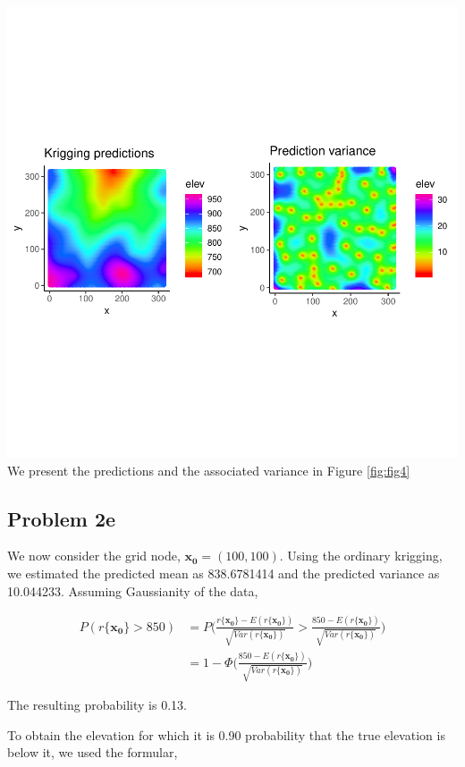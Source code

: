 \documentclass[]{article}
\newcommand{\vect}[1]{\ensuremath{\boldsymbol{\mathbf{#1}}}}
\begin{document}
\includegraphics{Exercise-1_files/figure-latex/fig4-1.pdf} We present
the predictions and the associated variance in Figure \ref{fig:fig4}

\hypertarget{problem-2e}{%
\subsection{Problem 2e}\label{problem-2e}}

We now consider the grid node, \(\vect{x_0} = (100,100)\). Using the
ordinary krigging, we estimated the predicted mean as 838.6781414 and
the predicted variance as 10.044233. Assuming Gaussianity of the data,

\begin{equation*}
    \begin{split}
P(r\{\vect{x_0}\} > 850) &=P\bigg( \frac{r\{\vect{x_0}\}- E(r\{\vect{x_0}\})}{\sqrt{Var(r\{\vect{x_0}\})}}> \frac{850- E(r\{\vect{x_0}\})}{\sqrt{Var(r\{\vect{x_0}\})}} \bigg)\\
&= 1 - \Phi\bigg(\frac{850- E(r\{\vect{x_0}\})}{\sqrt{Var(r\{\vect{x_0}\})}} \bigg)
  \end{split}
\end{equation*}

The resulting probability is 0.13.

To obtain the elevation for which it is 0.90 probability that the true
elevation is below it, we used the formular,
\end{document}
